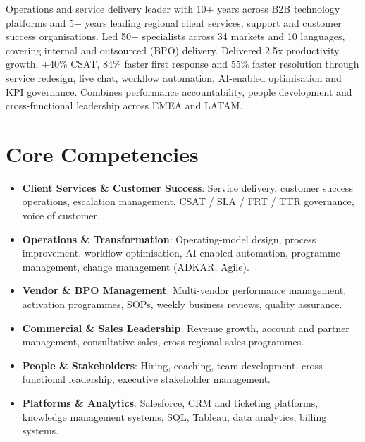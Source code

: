 \documentclass[11pt,a4paper,sans]{moderncv}
\begin{document}
\makecvtitle


\vspace{6pt}
\small{Operations and service delivery leader with 10+ years across B2B technology platforms and 5+ years leading regional client services, support and customer success organisations. Led 50+ specialists across 34 markets and 10 languages, covering internal and outsourced (BPO) delivery. Delivered 2.5x productivity growth, +40\% CSAT, 84\% faster first response and 55\% faster resolution through service redesign, live chat, workflow automation, AI-enabled optimisation and KPI governance. Combines performance accountability, people development and cross-functional leadership across EMEA and LATAM.}


\section{Core Competencies}
\vspace{1pt}
\begin{itemize}

\item \textbf{Client Services \& Customer Success}: Service delivery, customer success operations, escalation management, CSAT / SLA / FRT / TTR governance, voice of customer.

\item \textbf{Operations \& Transformation}: Operating-model design, process improvement, workflow optimisation, AI-enabled automation, programme management, change management (ADKAR, Agile).

\item \textbf{Vendor \& BPO Management}: Multi-vendor performance management, activation programmes, SOPs, weekly business reviews, quality assurance.

\item \textbf{Commercial \& Sales Leadership}: Revenue growth, account and partner management, consultative sales, cross-regional sales programmes.

\item \textbf{People \& Stakeholders}: Hiring, coaching, team development, cross-functional leadership, executive stakeholder management.

\item \textbf{Platforms \& Analytics}: Salesforce, CRM and ticketing platforms, knowledge management systems, SQL, Tableau, data analytics, billing systems.

\end{itemize}
\end{document}
